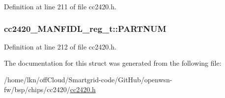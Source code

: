 Definition at line 211 of file cc2420.\+h.

\subsubsection[{\texorpdfstring{P\+A\+R\+T\+N\+UM}{PARTNUM}}]{ cc2420\+\_\+\+M\+A\+N\+F\+I\+D\+L\+\_\+reg\+\_\+t\+::\+P\+A\+R\+T\+N\+UM}\hypertarget{structcc2420___m_a_n_f_i_d_l__reg__t_a3a3ac97a3720ff1192cbac0be1a9a8c7}{}\label{structcc2420___m_a_n_f_i_d_l__reg__t_a3a3ac97a3720ff1192cbac0be1a9a8c7}


Definition at line 212 of file cc2420.\+h.



The documentation for this struct was generated from the following file\+:\begin{DoxyCompactItemize}
\item 
/home/lkn/off\+Cloud/\+Smartgrid-\/code/\+Git\+Hub/openwsn-\/fw/bsp/chips/cc2420/\hyperlink{cc2420_8h}{cc2420.\+h}\end{DoxyCompactItemize}
